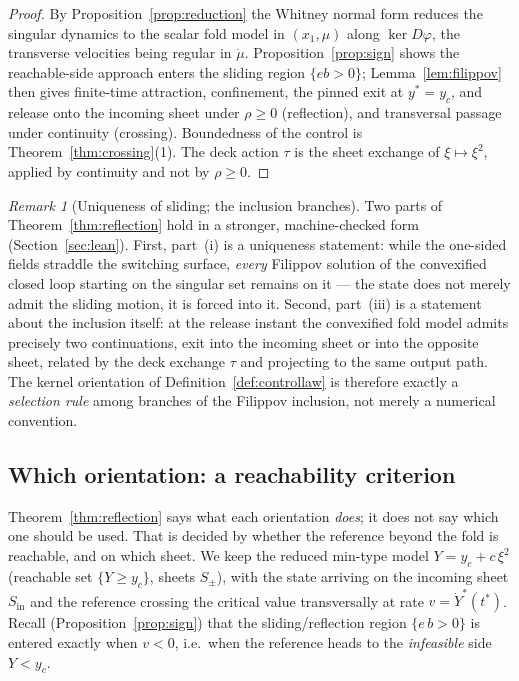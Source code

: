 \documentclass[11pt,american]{article}
\theoremstyle{definition}
\theoremstyle{plain}
\theoremstyle{remark}
\newtheorem{remark}{Remark}
\begin{document}
\begin{proof}
By Proposition~\ref{prop:reduction} the Whitney normal form reduces the singular dynamics to the scalar fold model in $(x_1,\mu)$ along $\ker D\varphi$, the transverse velocities being regular in $\dot\mu$. Proposition~\ref{prop:sign} shows the reachable-side approach enters the sliding region $\{eb>0\}$; Lemma~\ref{lem:filippov} then gives finite-time attraction, confinement, the pinned exit at $y^*=y_c$, and release onto the incoming sheet under $\rho\ge0$ (reflection), and transversal passage under continuity (crossing). Boundedness of the control is Theorem~\ref{thm:crossing}(1). The deck action $\tau$ is the sheet exchange of $\xi\mapsto\xi^2$, applied by continuity and not by $\rho\ge0$.
\end{proof}

\begin{remark}[Uniqueness of sliding; the inclusion branches]\label{rem:leanstrength}
Two parts of Theorem~\ref{thm:reflection} hold in a stronger, machine-checked form (Section~\ref{sec:lean}). First, part~(i) is a uniqueness statement: while the one-sided fields straddle the switching surface, \emph{every} Filippov solution of the convexified closed loop starting on the singular set remains on it --- the state does not merely admit the sliding motion, it is forced into it. Second, part~(iii) is a statement about the inclusion itself: at the release instant the convexified fold model admits precisely two continuations, exit into the incoming sheet or into the opposite sheet, related by the deck exchange $\tau$ and projecting to the same output path. The kernel orientation of Definition~\ref{def:controllaw} is therefore exactly a \emph{selection rule} among branches of the Filippov inclusion, not merely a numerical convention.
\end{remark}

\subsection{Which orientation: a reachability criterion}\label{subsec:reach}

Theorem~\ref{thm:reflection} says what each orientation \emph{does}; it does not say which one should be used. That is decided by whether the reference beyond the fold is reachable, and on which sheet. We keep the reduced min-type model $Y=y_c+c\,\xi^2$ (reachable set $\{Y\ge y_c\}$, sheets $S_\pm$), with the state arriving on the incoming sheet $S_{\mathrm{in}}$ and the reference crossing the critical value transversally at rate $v=\dot Y^*(t^*)$. Recall (Proposition~\ref{prop:sign}) that the sliding/reflection region $\{e\,b>0\}$ is entered exactly when $v<0$, i.e.\ when the reference heads to the \emph{infeasible} side $Y<y_c$.
\end{document}

